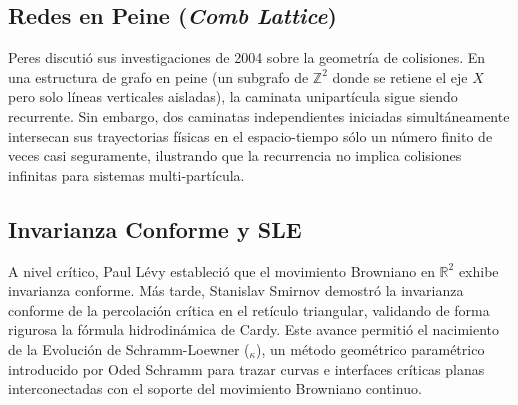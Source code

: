 \documentclass[11pt,a4paper]{article}
\begin{document}
\subsection{Redes en Peine (\textit{Comb Lattice})}
Peres discutió sus investigaciones de 2004 sobre la geometría de colisiones. En una estructura de grafo en peine (un subgrafo de $\mathbb{Z}^2$ donde se retiene el eje $X$ pero solo líneas verticales aisladas), la caminata unipartícula sigue siendo recurrente. Sin embargo, dos caminatas independientes iniciadas simultáneamente intersecan sus trayectorias físicas en el espacio-tiempo sólo un número finito de veces casi seguramente, ilustrando que la recurrencia no implica colisiones infinitas para sistemas multi-partícula.

\subsection{Invarianza Conforme y SLE}
A nivel crítico, Paul Lévy estableció que el movimiento Browniano en $\mathbb{R}^2$ exhibe invarianza conforme. Más tarde, Stanislav Smirnov demostró la invarianza conforme de la percolación crítica en el retículo triangular, validando de forma rigurosa la fórmula hidrodinámica de Cardy. Este avance permitió el nacimiento de la Evolución de Schramm-Loewner ($_\kappa$), un método geométrico paramétrico introducido por Oded Schramm para trazar curvas e interfaces críticas planas interconectadas con el soporte del movimiento Browniano continuo.
\end{document}
